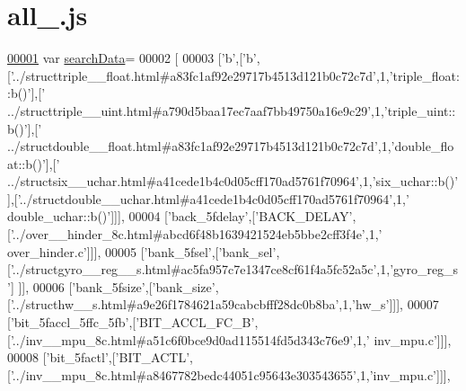 \hypertarget{all__2_8js_source}{}\section{all\+\_.\+js}
\label{all__2_8js_source}

\begin{DoxyCode}
\hypertarget{all__2_8js_source.tex_l00001}{}\hyperlink{all__2_8js_ad01a7523f103d6242ef9b0451861231e}{00001} var \hyperlink{all__2_8js_ad01a7523f103d6242ef9b0451861231e}{searchData}=
00002 [
00003   [\textcolor{charliteral}{'b'},[\textcolor{charliteral}{'b'},[\textcolor{stringliteral}{'../structtriple\_\_float.html#a83fc1af92e29717b4513d121b0c72c7d'},1,\textcolor{stringliteral}{'triple\_float::b()'}],[\textcolor{stringliteral}{'
      ../structtriple\_\_uint.html#a790d5baa17ec7aaf7bb49750a16e9c29'},1,\textcolor{stringliteral}{'triple\_uint::b()'}],[\textcolor{stringliteral}{'
      ../structdouble\_\_float.html#a83fc1af92e29717b4513d121b0c72c7d'},1,\textcolor{stringliteral}{'double\_float::b()'}],[\textcolor{stringliteral}{'
      ../structsix\_\_uchar.html#a41cede1b4c0d05cff170ad5761f70964'},1,\textcolor{stringliteral}{'six\_uchar::b()'}],[\textcolor{stringliteral}{'../structdouble\_\_uchar.html#a41cede1b4c0d05cff170ad5761f70964'},1,\textcolor{stringliteral}{'
      double\_uchar::b()'}]]],
00004   [\textcolor{stringliteral}{'back\_5fdelay'},[\textcolor{stringliteral}{'BACK\_DELAY'},[\textcolor{stringliteral}{'../over\_\_hinder\_8c.html#abcd6f48b1639421524eb5bbe2cff3f4e'},1,\textcolor{stringliteral}{'
      over\_hinder.c'}]]],
00005   [\textcolor{stringliteral}{'bank\_5fsel'},[\textcolor{stringliteral}{'bank\_sel'},[\textcolor{stringliteral}{'../structgyro\_\_reg\_\_s.html#ac5fa957c7e1347ce8cf61f4a5fc52a5c'},1,\textcolor{stringliteral}{'gyro\_reg\_s'}]
      ]],
00006   [\textcolor{stringliteral}{'bank\_5fsize'},[\textcolor{stringliteral}{'bank\_size'},[\textcolor{stringliteral}{'../structhw\_\_s.html#a9e26f1784621a59cabcbfff28dc0b8ba'},1,\textcolor{stringliteral}{'hw\_s'}]]],
00007   [\textcolor{stringliteral}{'bit\_5faccl\_5ffc\_5fb'},[\textcolor{stringliteral}{'BIT\_ACCL\_FC\_B'},[\textcolor{stringliteral}{'../inv\_\_mpu\_8c.html#a51c6f0bce9d0ad115514fd5d343c76e9'},1,\textcolor{stringliteral}{'
      inv\_mpu.c'}]]],
00008   [\textcolor{stringliteral}{'bit\_5factl'},[\textcolor{stringliteral}{'BIT\_ACTL'},[\textcolor{stringliteral}{'../inv\_\_mpu\_8c.html#a8467782bedc44051c95643e303543655'},1,\textcolor{stringliteral}{'inv\_mpu.c'}]]],

\end{DoxyCode}
